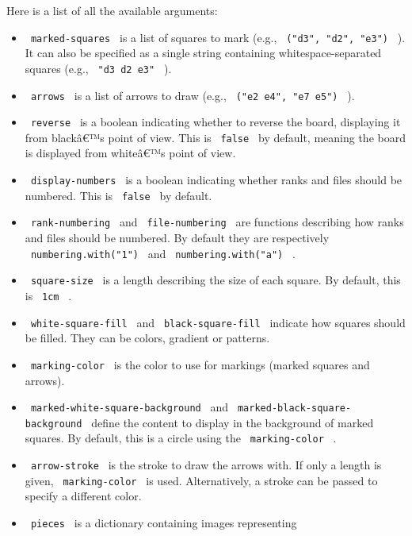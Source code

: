 \pandocbounded{}

Here is a list of all the available arguments:

\begin{itemize}
\item
  \texttt{\ marked-squares\ } is a list of squares to mark (e.g.,
  \texttt{\ ("d3",\ "d2",\ "e3")\ } ). It can also be specified as a
  single string containing whitespace-separated squares (e.g.,
  \texttt{\ "d3\ d2\ e3"\ } ).
\item
  \texttt{\ arrows\ } is a list of arrows to draw (e.g.,
  \texttt{\ ("e2\ e4",\ "e7\ e5")\ } ).
\item
  \texttt{\ reverse\ } is a boolean indicating whether to reverse the
  board, displaying it from blackâ€™s point of view. This is
  \texttt{\ false\ } by default, meaning the board is displayed from
  whiteâ€™s point of view.
\item
  \texttt{\ display-numbers\ } is a boolean indicating whether ranks and
  files should be numbered. This is \texttt{\ false\ } by default.
\item
  \texttt{\ rank-numbering\ } and \texttt{\ file-numbering\ } are
  functions describing how ranks and files should be numbered. By
  default they are respectively \texttt{\ numbering.with("1")\ } and
  \texttt{\ numbering.with("a")\ } .
\item
  \texttt{\ square-size\ } is a length describing the size of each
  square. By default, this is \texttt{\ 1cm\ } .
\item
  \texttt{\ white-square-fill\ } and \texttt{\ black-square-fill\ }
  indicate how squares should be filled. They can be colors, gradient or
  patterns.
\item
  \texttt{\ marking-color\ } is the color to use for markings (marked
  squares and arrows).
\item
  \texttt{\ marked-white-square-background\ } and
  \texttt{\ marked-black-square-background\ } define the content to
  display in the background of marked squares. By default, this is a
  circle using the \texttt{\ marking-color\ } .
\item
  \texttt{\ arrow-stroke\ } is the stroke to draw the arrows with. If
  only a length is given, \texttt{\ marking-color\ } is used.
  Alternatively, a stroke can be passed to specify a different color.
\item
  \texttt{\ pieces\ } is a dictionary containing images representing

\end{itemize}
